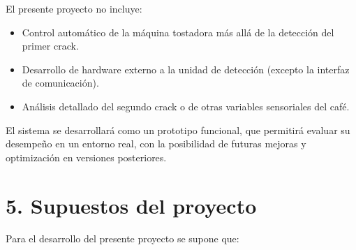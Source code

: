 \documentclass[
11pt, %
]{charter}
\begin{document}
El presente proyecto no incluye:
\begin{itemize}
	\item Control automático de la máquina tostadora más allá de la detección del primer crack.
	\item Desarrollo de hardware externo a la unidad de detección (excepto la interfaz de 				comunicación).
	\item Análisis detallado del segundo crack o de otras variables sensoriales del café.
	
\end{itemize}

El sistema se desarrollará como un prototipo funcional, que permitirá evaluar su desempeño en un entorno real, con la posibilidad de futuras mejoras y optimización en versiones posteriores.


\section{5. Supuestos del proyecto}
\label{sec:supuestos}

Para el desarrollo del presente proyecto se supone que:
\end{document}
